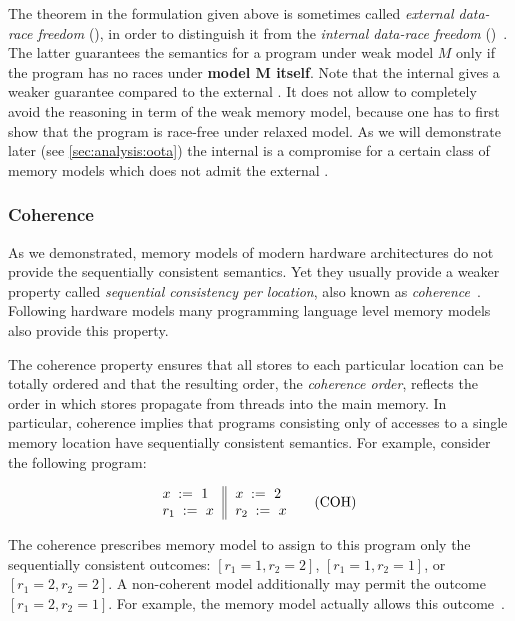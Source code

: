 The \DRF theorem in the formulation given above is 
sometimes called \emph{external data-race freedom} (\eDRF),
in order to distinguish it from the 
\emph{internal data-race freedom} (\iDRF)~\cite{Batty-al:ESOP15, Watt-al:PLDI2020}. 
The latter guarantees the \SC semantics for a program 
under weak model $M$ only if the program 
has no races under \textbf{model $\mathbf{M}$ itself}.
Note that the internal \DRF gives a weaker guarantee 
compared to the external \DRF. It does not allow to completely 
avoid the reasoning in term of the weak memory model, 
because one has to first show that the program 
is race-free under relaxed model. 
As we will demonstrate later (see \cref{sec:analysis:oota})
the internal \DRF is a compromise for a certain class 
of memory models which does not admit the external \DRF.

\subsubsection{Coherence}
\label{sec:background:coh}

As we demonstrated, memory models of 
modern hardware architectures do not 
provide the sequentially consistent semantics.
Yet they usually provide a weaker property 
called \emph{sequential consistency per location},
also known as \emph{coherence}~\cite{Alglave-al:TOPLAS14}.
Following hardware models many programming language level
memory models also provide this property. 

The coherence property ensures that 
all stores to each particular location 
can be totally ordered and that the 
resulting order, the \emph{coherence order}, reflects 
the order in which stores propagate from threads
into the main memory. 
In particular, coherence implies that  
programs consisting only of accesses to 
a single memory location have 
sequentially consistent semantics.
For example, consider the following program:

\begin{equation*}
\inarrII{
   \writeInst{}{x}{1}   \\
   \readInst{}{r_1}{x}  \\
}{
   \writeInst{}{x}{2}   \\
   \readInst{}{r_2}{x}  \\
}
\tag{COH}\label{ex:coh}
\end{equation*}

The coherence prescribes memory model 
to assign to this program only the 
sequentially consistent outcomes: 
${[r_1=1, r_2=2]}$, ${[r_1=1, r_2=1]}$, or ${[r_1=2, r_2=2]}$.
A non-coherent model additionally may permit 
the outcome ${[r_1=2, r_2=1]}$.
For example, the \Java memory model actually 
allows this outcome~\cite{Manson-al:POPL05}.

